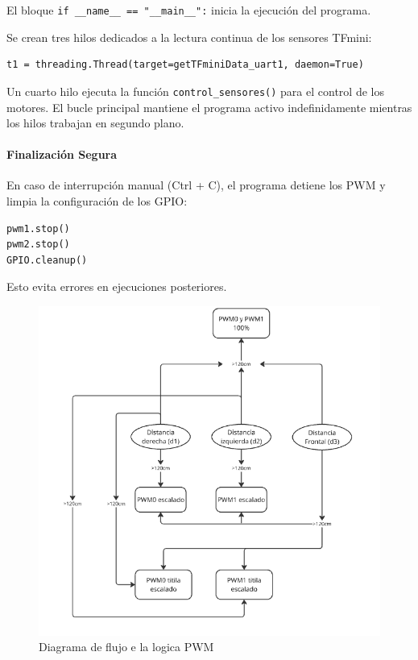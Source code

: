 \documentclass[12pt,a4paper]{article}
\begin{document}
\begin{itemize}
El bloque \texttt{if \_\_name\_\_ == "\_\_main\_\_":} inicia la ejecución del programa.

Se crean tres hilos dedicados a la lectura continua de los sensores TFmini:

\begin{verbatim}
t1 = threading.Thread(target=getTFminiData_uart1, daemon=True)
\end{verbatim}

Un cuarto hilo ejecuta la función \texttt{control\_sensores()} para el control de los motores.  
El bucle principal mantiene el programa activo indefinidamente mientras los hilos trabajan en segundo plano.
\end{itemize}

\paragraph{Finalización Segura}
\begin{itemize}
En caso de interrupción manual (Ctrl + C), el programa detiene los PWM y limpia la configuración de los GPIO:

\begin{verbatim}
pwm1.stop()
pwm2.stop()
GPIO.cleanup()
\end{verbatim}

Esto evita errores en ejecuciones posteriores.
\end{itemize}

\begin{figure}[H]
    \centering
    \includegraphics[width=\linewidth]{Carpeta tecnica/diagrama PWM.png}
    \caption{Diagrama de flujo e la logica PWM}
\end{figure}
\end{document}
